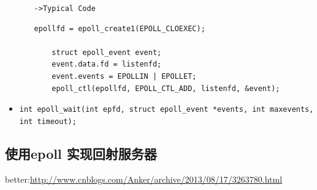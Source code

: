 \documentclass[UTF8,a4paper,8pt]{ctexbook}
\begin{document}
\begin{itemize}
\begin{enumerate}[itemindent = 1em]
							\verb|->Typical Code|
							\begin{lstlisting}[frame=L]
	epollfd = epoll_create1(EPOLL_CLOEXEC);
			
	struct epoll_event event;
	event.data.fd = listenfd;
	event.events = EPOLLIN | EPOLLET;
	epoll_ctl(epollfd, EPOLL_CTL_ADD, listenfd, &event);
							\end{lstlisting}
					\end{enumerate}
				\item \verb|int epoll_wait(int epfd, struct epoll_event *events, int maxevents, int timeout);|
			\end{itemize}
		\subsection{使用epoll 实现回射服务器}
			better:\url{http://www.cnblogs.com/Anker/archive/2013/08/17/3263780.html}
			
\end{document}
